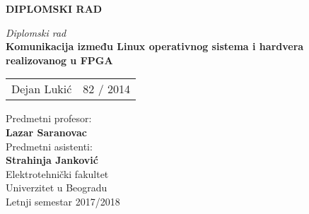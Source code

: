 	
\thispagestyle{empty}
\noindent
\noindent
\begin{center}
	\textup{\small {\bf DIPLOMSKI RAD}}\\[0.2in]
	\vspace{2.5in}

	\emph{Diplomski rad}\\
	
	\Large {\textbf {Komunikacija između Linux operativnog sistema i hardvera realizovanog u FPGA }}\\[2in]
	

	\vspace{0.5in}
	\begin{table}[h]
		\centering
		\begin{tabular}{lr}
			Dejan Lukić & 82 / 2014 \\
		\end{tabular}
	\end{table}
	
	\vspace{0.1in}
	Predmetni profesor:\\
	{\textbf{Lazar Saranovac}}\\
	Predmetni asistenti:\\
	{\textbf{Strahinja Janković}}\\
	\vspace{0.5in}	
		\Large{Elektrotehni\v cki fakultet}\\
	\normalsize
	Univerzitet u Beogradu \\
	
	Letnji semestar 2017/2018
	
	\vfill
	
\end{center}

\pagebreak